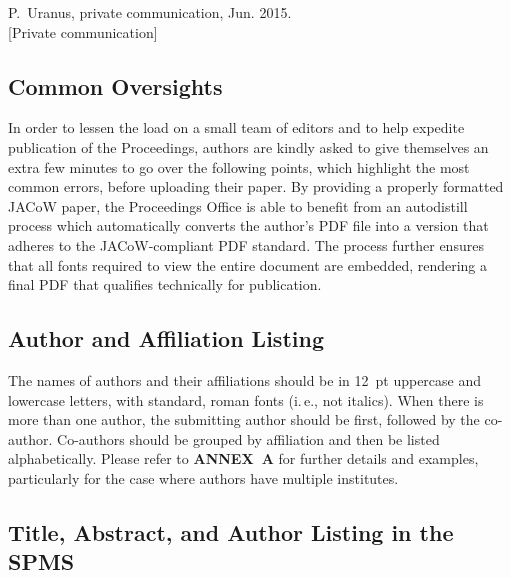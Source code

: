 \documentclass[letterpaper,  %
              ]{jacow-2_3}   %
\newcommand\SEC[1]{\textbf{\uppercase{#1}}}
\begin{document}
{{\begin{thebibliography}{99}
	P.~Uranus, private communication, Jun. 2015.\\
	\textcolor{junpu}{[Private communication]}

\end{thebibliography}
\null  %

\newpage


\subsection{Common Oversights}

In order to lessen the load on a small team of editors
and to help expedite publication of the Proceedings, authors
are kindly asked to give themselves an extra few
minutes to go over the following points, which highlight
the most common errors, before uploading their paper. By
providing a properly formatted JACoW paper, the Proceedings
Office is able to benefit from an autodistill process
which automatically converts the author's PDF file
into a version that adheres to the JACoW-compliant PDF
standard. The process further ensures that all fonts required
to view the entire document are embedded, rendering
a final PDF that qualifies technically for publication.


\subsection{Author and Affiliation Listing}

The names of authors and their affiliations should be in
\SI{12}{pt} uppercase and lowercase letters, with standard,
roman fonts (i.\,e., not italics). When there is more than
one author, the submitting author should be first, followed
by the co-author. Co-authors should be grouped by affiliation
and then be listed alphabetically. Please refer to \SEC{Annex~A}
for further details and examples, particularly for
the case where authors have multiple institutes.

\subsection{Title, Abstract, and Author Listing in the SPMS}

}}
\end{document}
